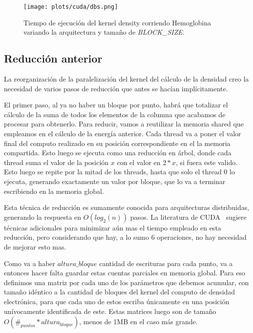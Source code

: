 \begin{figure}[htbp]
   \centering
   \texttt{[image: plots/cuda/dbs.png]}
   \caption{Tiempo de ejecuci\'on del kernel density corriendo Hemoglobina variando
   la arquitectura y tama\~no de \textit{BLOCK\_SIZE}.}
   \label{plt:dbs-runtime}
\end{figure}


\subsection{Reducci\'on anterior}
La reorganizaci\'on de la paralelizaci\'on del kernel del c\'alculo de la densidad creo la necesidad
de varios pasos de reducci\'on que antes se hac\'ian impl\'icitamente.

El primer paso, al ya no haber un bloque por punto, habr\'a que totalizar el c\'alculo de la
suma de todos los elementos de la columna que acabamos de procesar para obtenerlo. Para reducir,
vamos a reutilizar la memoria shared que empleamos en el c\'alculo de la energ\'ia anterior. Cada
thread va a poner el valor final del computo realizado en su posici\'on correspondiente en el
la memoria compartida. Esto luego se ejecuta como una reducci\'on en \'arbol, donde cada
thread suma el valor de la posici\'on $x$ con el valor en $2*x$, si fuera este valido. Esto
luego se repite por la mitad de los threads, hasta que solo el thread 0 lo ejecuta,
generando exactamente un valor por bloque, que lo va a terminar escribiendo en la memoria
global.

Esta t\'ecnica de reducci\'on es sumamente conocida para arquitecturas distribuidas, generando
la respuesta en $O(log_2(n))$ pasos. La literatura de CUDA~\cite{cudaReductions} sugiere t\'ecnicas adicionales para
minimizar a\'un mas el tiempo empleado en esta reducci\'on, pero considerando que hay, a lo sumo
6 operaciones, no hay necesidad de mejorar esto mas.

Como va a haber $altura\_{bloque}$ cantidad de escrituras para cada punto, va a entonces
hacer falta guardar estas cuentas parciales en memoria global. Para eso definimos una matriz
por cada uno de los par\'ametros que debemos acumular, con tama\~no id\'entico a la cantidad de bloques
del kernel del computo de densidad electr\'onica, para que cada uno de estos escriba \'unicamente en una posici\'on
un\'ivocamente identificada de este. Estas matrices luego son de tama\~no $O(\#_{puntos} * altura_{bloque})$,
menos de 1MB en el caso m\'as grande.


